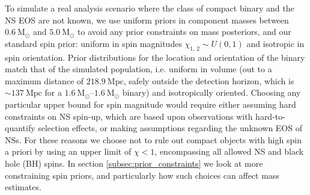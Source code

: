 To simulate a real analysis scenario where the class of compact binary and the NS EOS are not known, we use uniform priors in component masses between $0.6~\mathrm{M}_\odot$ and $5.0~\mathrm{M}_\odot$ to avoid any prior constraints on mass posteriors, and our standard spin prior: uniform in spin magnitudes $\chi_{1,\,2} \sim U(0, 1)$ and isotropic in spin orientation. Prior distributions for the location and orientation of the binary match that of the simulated population, i.e. uniform in volume (out to a maximum distance of $218.9~\mathrm{Mpc}$, safely outside the detection horizon, which is $\sim137~\mathrm{Mpc}$ for a $1.6~\mathrm{M}_\odot$--$1.6~\mathrm{M}_\odot$ binary) and isotropically oriented.  Choosing any particular upper bound for spin magnitude would require either assuming hard constraints on NS spin-up, which are based upon observations with hard-to-quantify selection effects, or making assumptions regarding the unknown EOS of NSs. For these reasons we choose not to rule out compact objects with high spin a priori by using an upper limit of $\chi < 1$, encompassing all allowed NS and black hole (BH) spins.  In section \ref{subsec:prior_constraints} we look at more constraining spin priors, and particularly how such choices can affect mass estimates.
  
  
  
  
  
  
  
  